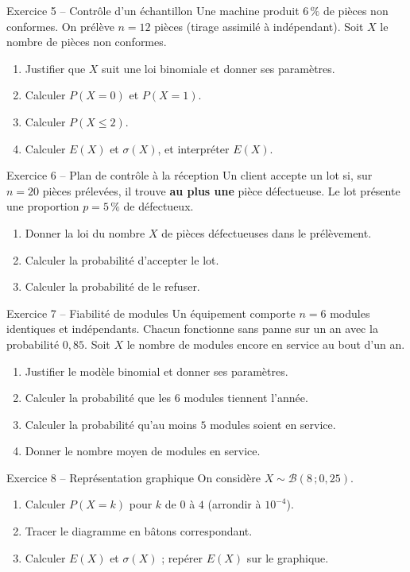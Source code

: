 \documentclass[a4paper,11pt]{article}
\begin{document}
\begin{exo}{Exercice 5 -- Contrôle d'un échantillon}
Une machine produit $6\,\%$ de pièces non conformes. On prélève $n = 12$ pièces (tirage assimilé à indépendant). Soit $X$ le nombre de pièces non conformes.
\begin{enumerate}[label=\alph*)]
  \item Justifier que $X$ suit une loi binomiale et donner ses paramètres.
  \item Calculer $P(X = 0)$ et $P(X = 1)$.
  \item Calculer $P(X \leq 2)$.
  \item Calculer $E(X)$ et $\sigma(X)$, et interpréter $E(X)$.
\end{enumerate}
\end{exo}

\begin{exo}{Exercice 6 -- Plan de contrôle à la réception}
Un client accepte un lot si, sur $n = 20$ pièces prélevées, il trouve \textbf{au plus une} pièce défectueuse. Le lot présente une proportion $p = 5\,\%$ de défectueux.
\begin{enumerate}[label=\alph*)]
  \item Donner la loi du nombre $X$ de pièces défectueuses dans le prélèvement.
  \item Calculer la probabilité d'accepter le lot.
  \item Calculer la probabilité de le refuser.
\end{enumerate}
\end{exo}

\begin{exo}{Exercice 7 -- Fiabilité de modules}
Un équipement comporte $n = 6$ modules identiques et indépendants. Chacun fonctionne sans panne sur un an avec la probabilité $0{,}85$. Soit $X$ le nombre de modules encore en service au bout d'un an.
\begin{enumerate}[label=\alph*)]
  \item Justifier le modèle binomial et donner ses paramètres.
  \item Calculer la probabilité que les $6$ modules tiennent l'année.
  \item Calculer la probabilité qu'au moins $5$ modules soient en service.
  \item Donner le nombre moyen de modules en service.
\end{enumerate}
\end{exo}

\begin{exo}{Exercice 8 -- Représentation graphique}
On considère $X \sim \mathcal{B}(8\,;0{,}25)$.
\begin{enumerate}[label=\alph*)]
  \item Calculer $P(X = k)$ pour $k$ de $0$ à $4$ (arrondir à $10^{-4}$).
  \item Tracer le diagramme en bâtons correspondant.
  \item Calculer $E(X)$ et $\sigma(X)$ ; repérer $E(X)$ sur le graphique.
\end{enumerate}
\end{exo}
\end{document}
